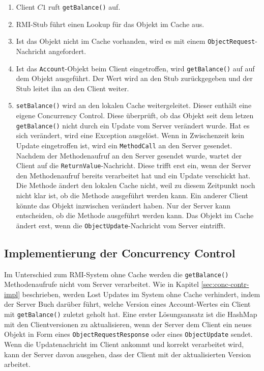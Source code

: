 \begin{enumerate}
\item Client $C1$ ruft \verb+getBalance()+ auf.
\item RMI-Stub führt einen Lookup für das Objekt im Cache aus.
\item Ist das Objekt nicht im Cache vorhanden, wird es mit einem \texttt{Object\-Request}-Nachricht angefordert.
\item Ist das \texttt{Account}-Objekt beim Client eingetroffen, wird \verb+getBalance()+ auf auf dem Objekt ausgeführt. Der Wert wird an den Stub zurück\-gegeben und der Stub leitet ihn an den Client weiter.
\item \verb+setBalance()+ wird an den lokalen Cache weitergeleitet. Dieser enthält eine eigene Concurrency Control. Diese überprüft, ob das Objekt seit dem letzen \verb+getBalance()+ nicht durch ein Update vom Server verändert wurde. Hat es sich verändert, wird eine Exception ausgelöst. Wenn in Zwischenzeit kein Update eingetroffen ist, wird ein \texttt{MethodCall} an den Server gesendet. Nachdem der Methodenaufruf an den Server gesendet wurde, wartet der Client auf die \texttt{ReturnValue}-Nachricht. Diese trifft erst ein, wenn der Server den Methodenaufruf bereits verarbeitet hat und ein Update verschickt hat. Die Methode ändert den lokalen Cache nicht, weil zu diesem Zeitpunkt noch nicht klar ist, ob die Methode ausgeführt werden kann. Ein anderer Client könnte das Objekt inzwischen verändert haben. Nur der Server kann entscheiden, ob die Methode ausgeführt werden kann. Das Objekt im Cache ändert erst, wenn die \texttt{ObjectUpdate}-Nachricht vom Server eintrifft.
\end{enumerate}

\subsection{Implementierung der Concurrency Control}
\label{sec:impl-der-conc}

Im Unterschied zum RMI-System ohne Cache werden die \texttt{getBalance()} Methodenaufrufe nicht vom Server verarbeitet. Wie in Kapitel \ref{sec:conc-contr-impl} beschrieben, werden Lost Updates im System ohne Cache verhindert, indem der Server Buch darüber führt, welche Version eines Account-Wertes ein Client mit \texttt{getBalance()} zuletzt geholt hat. Eine erster Lösungsansatz ist die HashMap mit den Clientversionen zu aktualisieren, wenn der Server dem Client ein neues Objekt in Form eines \texttt{ObjectRequestResponse} oder eines \texttt{ObjectUpdate} sendet. Wenn die Updatenachricht im Client ankommt und korrekt verarbeitet wird, kann der Server davon ausgehen, dass der Client mit der aktualisierten Version arbeitet.

